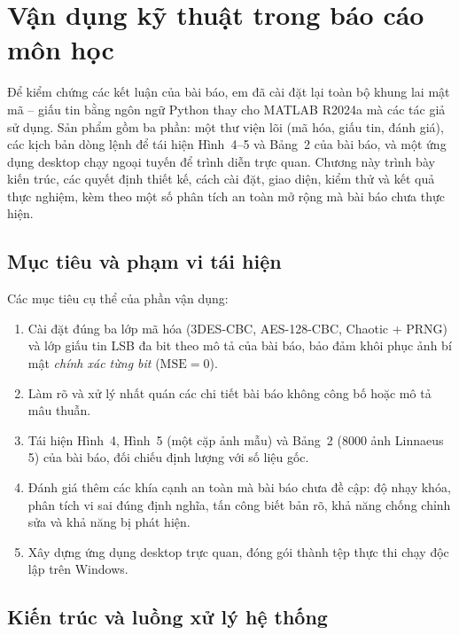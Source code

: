 \chapter{Vận dụng kỹ thuật trong báo cáo môn học}
\label{chap:vandung}

Để kiểm chứng các kết luận của bài báo, em đã cài đặt lại toàn bộ khung lai mật mã -- giấu tin
bằng ngôn ngữ Python thay cho MATLAB R2024a mà các tác giả sử dụng. Sản phẩm gồm ba phần: một
thư viện lõi (mã hóa, giấu tin, đánh giá), các kịch bản dòng lệnh để tái hiện Hình~4--5 và
Bảng~2 của bài báo, và một ứng dụng desktop chạy ngoại tuyến để trình diễn trực quan. Chương này
trình bày kiến trúc, các quyết định thiết kế, cách cài đặt, giao diện, kiểm thử và kết quả thực
nghiệm, kèm theo một số phân tích an toàn mở rộng mà bài báo chưa thực hiện.

\section{Mục tiêu và phạm vi tái hiện}

Các mục tiêu cụ thể của phần vận dụng:
\begin{enumerate}
  \item Cài đặt đúng ba lớp mã hóa (3DES-CBC, AES-128-CBC, Chaotic + PRNG) và lớp giấu tin LSB
        đa bit theo mô tả của bài báo, bảo đảm khôi phục ảnh bí mật \emph{chính xác từng bit}
        ($\mathrm{MSE} = 0$).
  \item Làm rõ và xử lý nhất quán các chi tiết bài báo không công bố hoặc mô tả mâu thuẫn.
  \item Tái hiện Hình~4, Hình~5 (một cặp ảnh mẫu) và Bảng~2 (8000 ảnh Linnaeus 5) của bài báo,
        đối chiếu định lượng với số liệu gốc.
  \item Đánh giá thêm các khía cạnh an toàn mà bài báo chưa đề cập: độ nhạy khóa, phân tích vi
        sai đúng định nghĩa, tấn công biết bản rõ, khả năng chống chỉnh sửa và khả năng bị phát hiện.
  \item Xây dựng ứng dụng desktop trực quan, đóng gói thành tệp thực thi chạy độc lập trên
        Windows.
\end{enumerate}

\section{Kiến trúc và luồng xử lý hệ thống}

